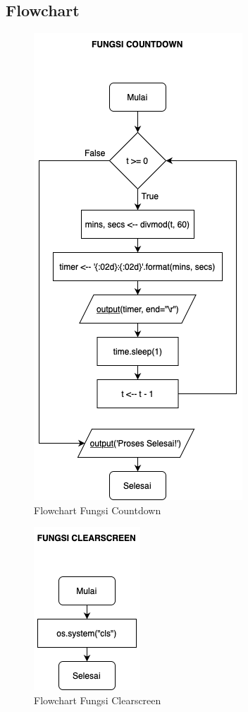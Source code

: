 \documentclass[conference]{IEEEtran}
\begin{document}
\subsection{Flowchart}

\begin{figure}[htbp]
    \centering
    \def\svgwidth{\columnwidth}
    \centerline{\includegraphics[scale=0.45]{Time.png}}
    \caption{Flowchart Fungsi Countdown}
    \label{fig2}
\end{figure}

\begin{figure}[htbp]
    \centering
    \def\svgwidth{\columnwidth}
    \centerline{\includegraphics[scale=0.35]{Clearscreen.png}}
    \caption{Flowchart Fungsi Clearscreen}
    \label{fig3}
\end{figure}
\end{document}
